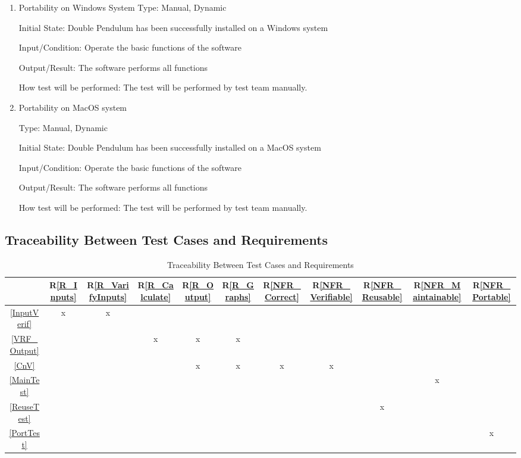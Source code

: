 \documentclass[12pt, titlepage]{article}
\newcommand{\rref}[1]{R\ref{#1}}
\begin{document}
\begin{enumerate}
\item{Portability on Windows System} 
Type: Manual, Dynamic

Initial State: Double Pendulum has been successfully installed on a Windows
system
          
Input/Condition: Operate the basic functions of the software
          
Output/Result: The software performs all functions
          
How test will be performed: The test will be performed by test team manually.

\item{Portability on MacOS system}

Type: Manual, Dynamic

Initial State: Double Pendulum has been successfully installed on a MacOS system
          
Input/Condition: Operate the basic functions of the software
          
Output/Result: The software performs all functions
          
How test will be performed: The test will be performed by test team manually.

\end{enumerate}

\subsection{Traceability Between Test Cases and Requirements}

\begin{table}[H]
\centering
\begin{tabular}{|c|c|c|c|c|c|c|c|c|c|c|}
\hline
  & \rref{R_Inputs}& \rref{R_VarifyInputs} &  \rref{R_Calculate} & \rref{R_Output}
  & \rref{R_Graphs}& \rref{NFR_Correct}& \rref{NFR_Verifiable} &
                                                                 \rref{NFR_Reusable}
  & \rref{NFR_Maintainable} & \rref{NFR_Portable}\\
  
\hline
\ref{InputVerif}      &x&x&&&&&&&&\\ \hline
\ref{VRF_Output}     &&&x&x&x&&&&&\\ \hline
\ref{CnV}      &&&&x&x&x&x&&&\\ \hline
\ref{MainTest}      &&&&&&&& &x&\\ \hline
\ref{ReuseTest}      &&&&&&&&x&&\\ \hline
\ref{PortTest}      &&&&&&&&&&x\\  
\hline
\end{tabular}
\caption{Traceability Between Test Cases and Requirements}
\label{Table:R_trace}

\end{table}
		
\end{document}
